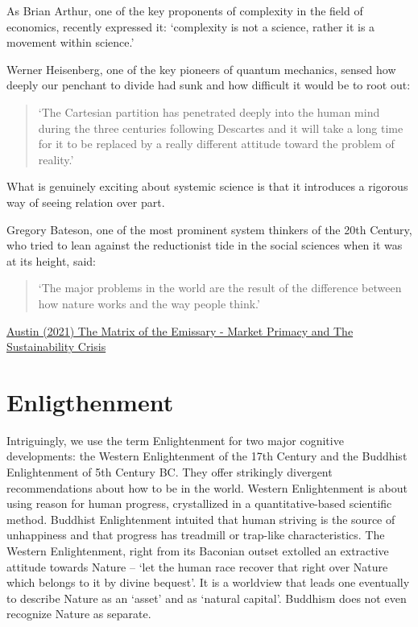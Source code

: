 \documentclass[
]{book}
\begin{document}
As Brian Arthur, one of the key proponents of complexity in the field of economics, recently expressed it: `complexity is not a science, rather it is a movement within science.'

Werner Heisenberg, one of the key pioneers of quantum mechanics, sensed how deeply our penchant to divide had sunk and how difficult it would be to root out:

\begin{quote}
`The Cartesian partition has penetrated deeply into the human mind during the three centuries following Descartes and it will take a long time for it to be replaced by a really different attitude toward the problem of reality.'
\end{quote}

What is genuinely exciting about systemic science is that it introduces a rigorous way of seeing relation over part.

Gregory Bateson, one of the most prominent system thinkers of the 20th Century, who tried to lean against the reductionist tide in the social sciences when it was at its height, said:

\begin{quote}
`The major problems in the world are the result of the difference between how nature works and the way people think.'
\end{quote}

\href{https://channelmcgilchrist.com/articles/the-matrix-of-the-emissary/}{Austin (2021) The Matrix of the Emissary - Market Primacy and The Sustainability Crisis}

\hypertarget{enligthenment}{%
\section{Enligthenment}\label{enligthenment}}

Intriguingly, we use the term Enlightenment for two major cognitive developments: the Western Enlightenment of the 17th Century and the Buddhist Enlightenment of 5th Century BC. They offer strikingly divergent recommendations about how to be in the world. Western Enlightenment is about using reason for human progress, crystallized in a quantitative-based scientific method. Buddhist Enlightenment intuited that human striving is the source of unhappiness and that progress has treadmill or trap-like characteristics. The Western Enlightenment, right from its Baconian outset extolled an extractive attitude towards Nature -- `let the human race recover that right over Nature which belongs to it by divine bequest'. It is a worldview that leads one eventually to describe Nature as an `asset' and as `natural capital'. Buddhism does not even recognize Nature as separate.
\end{document}
